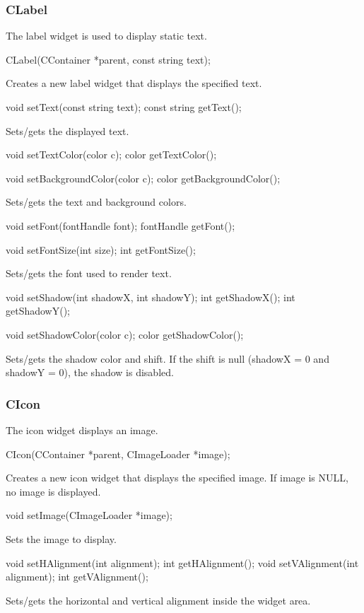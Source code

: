 \documentclass[a4paper,11pt]{journal}
\begin{document}
\subsubsection{CLabel}
The label widget is used to display static text.\\
\begin{verbatimtab}CLabel(CContainer *parent, const string text);\end{verbatimtab}
Creates a new label widget that displays the specified text.\\
\begin{verbatimtab}
void setText(const string text);
const string getText();
\end{verbatimtab}
Sets/gets the displayed text.\\
\begin{verbatimtab}
void setTextColor(color c);
color getTextColor();

void setBackgroundColor(color c);
color getBackgroundColor();
\end{verbatimtab}
Sets/gets the text and background colors.\\
\begin{verbatimtab}
void setFont(fontHandle font);
fontHandle getFont();

void setFontSize(int size);
int getFontSize();
\end{verbatimtab}
Sets/gets the font used to render text.\\
\begin{verbatimtab}
void setShadow(int shadowX, int shadowY);
int getShadowX();
int getShadowY();

void setShadowColor(color c);
color getShadowColor();
\end{verbatimtab}
Sets/gets the shadow color and shift. If the shift is null (shadowX = 0 and shadowY = 0), the shadow is disabled.\\
\subsubsection{CIcon}
The icon widget displays an image.\\
\begin{verbatimtab}CIcon(CContainer *parent, CImageLoader *image);\end{verbatimtab}
Creates a new icon widget that displays the specified image. If image is NULL, no image is displayed.\\
\begin{verbatimtab}void setImage(CImageLoader *image);\end{verbatimtab}
Sets the image to display.\\
\begin{verbatimtab}
void setHAlignment(int alignment);
int getHAlignment();
void setVAlignment(int alignment);
int getVAlignment();
\end{verbatimtab}
Sets/gets the horizontal and vertical alignment inside the widget area.
\end{document}
